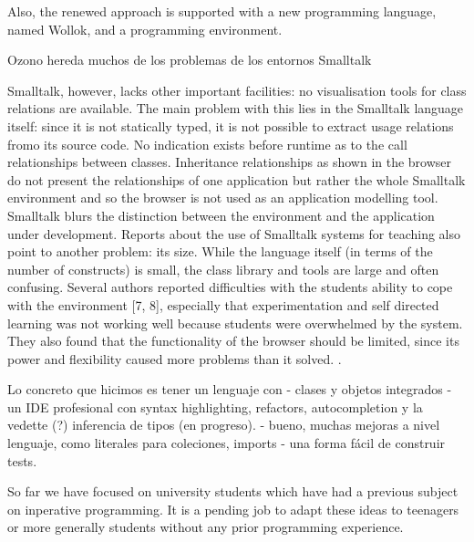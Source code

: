 Also, the renewed approach is supported with a new programming language, named Wollok, and a programming environment.



Ozono hereda muchos de los problemas de los entornos Smalltalk

Smalltalk, however, lacks other important facilities: no visualisation tools for class
relations are available. The main problem with this lies in the Smalltalk language 
itself: since it is not statically typed, it is not possible to extract usage relations fromo
its source code. No indication exists before runtime as to the call relationships
between classes. Inheritance relationships as shown in the browser do not present
the relationships of one application but rather the whole Smalltalk environment and
so the browser is not used as an application modelling tool. Smalltalk blurs the
distinction between the environment and the application under development.
Reports about the use of Smalltalk systems for teaching also point to another
problem: its size. While the language itself (in terms of the number of constructs) is
small, the class library and tools are large and often confusing. Several authors
reported difficulties with the students ability to cope with the environment [7, 8],
especially that experimentation and self directed learning was not working well
because students were overwhelmed by the system. They also found that the
functionality of the browser should be limited, since its power and flexibility caused
more problems than it solved. \cite{kolling_problem_1999}.


Lo concreto que hicimos es tener un lenguaje con
- clases y objetos integrados
- un IDE profesional con syntax highlighting, refactors, autocompletion y la vedette (?) inferencia de tipos (en progreso).
- bueno, muchas mejoras a nivel lenguaje, como literales para coleciones, imports
- una forma fácil de construir tests.


So far we have focused on university students which have had a previous subject on inperative programming.
It is a pending job to adapt these ideas to teenagers or more generally students without any prior programming experience.
